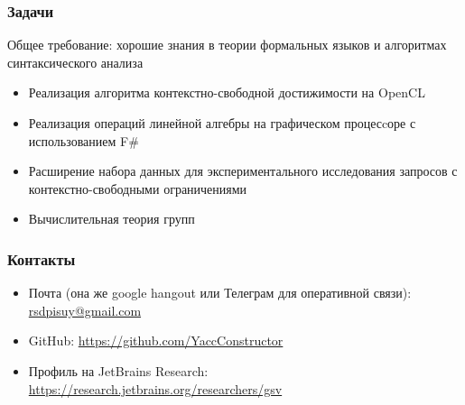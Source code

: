 \documentclass{beamer}
\begin{document}
\begin{frame}[fragile]
\frametitle{Задачи}
  Общее требование: хорошие знания в теории формальных языков и алгоритмах синтаксического анализа
  \begin{itemize}
    \item Реализация алгоритма контекстно-свободной достижимости на OpenCL
    \item Реализация операций линейной алгебры на графическом процесcоре с использованием F\# 
    \item Расширение набора данных для экспериментального исследования запросов с контекстно-свободными ограничениями
    \item Вычислительная теория групп
  \end{itemize}
\end{frame}


\begin{frame}
\frametitle{Контакты}
\begin{itemize}
  \item Почта (она же google hangout или Телеграм для оперативной связи): \url{rsdpisuy@gmail.com}
  \item GitHub: \url{https://github.com/YaccConstructor}
  \item Профиль на JetBrains Research: \url{https://research.jetbrains.org/researchers/gsv}
\end{itemize}
\end{frame}
\end{document}
